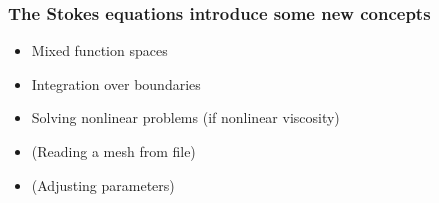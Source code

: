 \begin{frame}
  \frametitle{The Stokes equations introduce some new concepts}

  \begin{itemize}
  \item
    Mixed function spaces
  \item
    Integration over boundaries
  \item
    Solving nonlinear problems (if nonlinear viscosity)
  \item
    (Reading a mesh from file)
  \item
    (Adjusting parameters)
  \end{itemize}

\end{frame}

